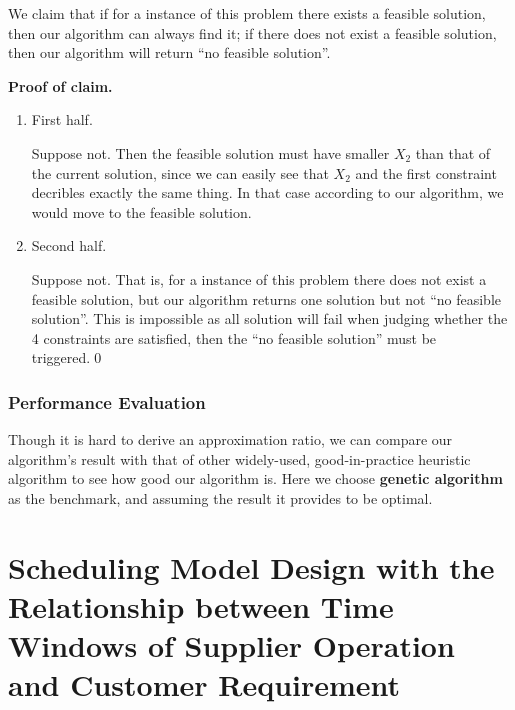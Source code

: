 \documentclass{llncs}
\begin{document}
\begin{itemize}
    We claim that if for a instance of this problem there exists a feasible solution, then our algorithm can always find it; if there does not exist a feasible solution, then our algorithm will return ``no feasible solution''.
    
    \textbf{Proof of claim.} 
    \begin{enumerate}
        \item First half.
        
        Suppose not. Then the feasible solution must have smaller $X_2$ than that of the current solution, since we can easily see that $X_2$ and the first constraint decribles exactly the same thing. In that case according to our algorithm, we would move to the feasible solution.
        \item Second half.
        
        Suppose not. That is, for a instance of this problem there does not exist a feasible solution, but our algorithm returns one solution but not ``no feasible solution''. This is impossible as all solution will fail when judging whether the 4 constraints are satisfied, then the ``no feasible solution'' must be triggered.\qed
    \end{enumerate}
    
\end{itemize}
\subsubsection{Performance Evaluation}
Though it is hard to derive an approximation ratio, we can compare our algorithm's result with that of other widely-used, good-in-practice heuristic algorithm to see how good our algorithm is. Here we choose \textbf{genetic algorithm} as the benchmark, and assuming the result it provides to be optimal.
\section{Scheduling Model Design with the Relationship between Time Windows of Supplier
    Operation and Customer Requirement}
\end{document}
